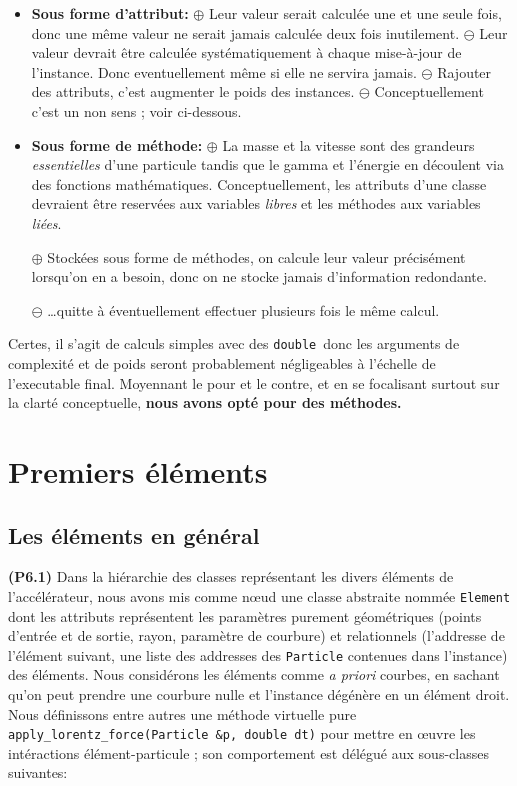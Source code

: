 \documentclass[12pt, letterpaper, twoside]{article}
\newcommand{\T}[1]{\texttt{#1}}
\newcommand{\double}{\texttt{double}}
\begin{document}
\begin{itemize}

\item \textbf{Sous forme d'attribut:}
\subitem $\oplus$ Leur valeur serait calculée une et une seule fois, donc une même valeur ne serait jamais calculée deux fois inutilement.
\subitem $\ominus$ Leur valeur devrait être calculée systématiquement à chaque mise-à-jour de l'instance. Donc eventuellement même si elle ne servira jamais.
\subitem $\ominus$ Rajouter des attributs, c'est augmenter le poids des instances.
\subitem $\ominus$ Conceptuellement c'est un non sens ; voir ci-dessous.

\item \textbf{Sous forme de méthode:}
\subitem $\oplus$ La masse et la vitesse sont des grandeurs \textit{essentielles} d'une particule tandis que le gamma et l'énergie en découlent via des fonctions mathématiques. Conceptuellement, les attributs d'une classe devraient être reservées aux variables \textit{libres} et les méthodes aux variables \textit{liées}.

\subitem $\oplus$ Stockées sous forme de méthodes, on calcule leur valeur précisément lorsqu'on en a besoin, donc on ne stocke jamais d'information redondante.

\subitem $\ominus$ \ldots quitte à éventuellement effectuer plusieurs fois le même calcul.
\end{itemize}
\bigskip
Certes, il s'agit de calculs simples avec des \double\ donc les arguments de complexité et de poids seront probablement négligeables à l'échelle de l'executable final. Moyennant le pour et le contre, et en se focalisant surtout sur la clarté conceptuelle, \textbf{nous avons opté pour des méthodes.}

\section{Premiers éléments}

\subsection{Les éléments en général}
\noindent \textbf{(P6.1)} Dans la hiérarchie des classes représentant les divers éléments de l'accélérateur, nous avons mis comme nœud une classe abstraite nommée \T{Element} dont les attributs représentent les paramètres purement géométriques (points d'entrée et de sortie, rayon, paramètre de courbure) et relationnels (l'addresse de l'élément suivant, une liste des addresses des \T{Particle} contenues dans l'instance) des éléments. Nous considérons les éléments comme \textit{a priori} courbes, en sachant qu'on peut prendre une courbure nulle et l'instance dégénère en un élément droit. Nous définissons entre autres une méthode virtuelle pure \T{apply\_lorentz\_force(Particle \&p, double dt)} pour mettre en œuvre les intéractions élément-particule ; son comportement est délégué aux sous-classes suivantes:
\end{document}
